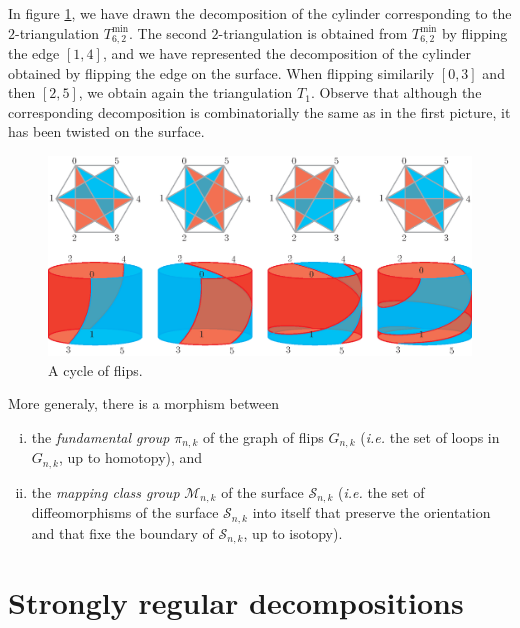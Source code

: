 \documentclass[12pt]{amsart}
\begin{document}
\begin{example}
In figure \ref{monodromy}, we have drawn the decomposition of the cylinder corresponding to the $2$-triangulation $T_{6,2}^{\min}$. The second $2$-triangulation is obtained from $T_{6,2}^{\min}$ by flipping the edge $[1,4]$, and we have represented the decomposition of the cylinder obtained by flipping the edge on the surface. When flipping similarily $[0,3]$ and then $[2,5]$, we obtain again the triangulation $T_1$. Observe that although the corresponding decomposition is combinatorially the same as in the first picture, it has been twisted on the surface. 

\begin{figure}
\centerline{\includegraphics[scale=.7]{monodromy.eps}}
\caption{\small{A cycle of flips.}}\label{monodromy}
\end{figure}
\end{example}

More generaly, there is a morphism between
\begin{enumerate}[(i)]
\item the \emph{fundamental group} $\pi_{n,k}$ of the graph of flips $G_{n,k}$ ({\it i.e.} the set of loops in $G_{n,k}$, up to homotopy), and
\item the \emph{mapping class group} $\mathcal{M}_{n,k}$ of the surface $\mathcal{S}_{n,k}$ ({\it i.e.} the set of diffeomorphisms of the surface $\mathcal{S}_{n,k}$ into itself that preserve the orientation and that fixe the boundary of $\mathcal{S}_{n,k}$, up to isotopy).
\end{enumerate}






\section{Strongly regular decompositions}\label{sectionregulardecomp}
\end{document}
